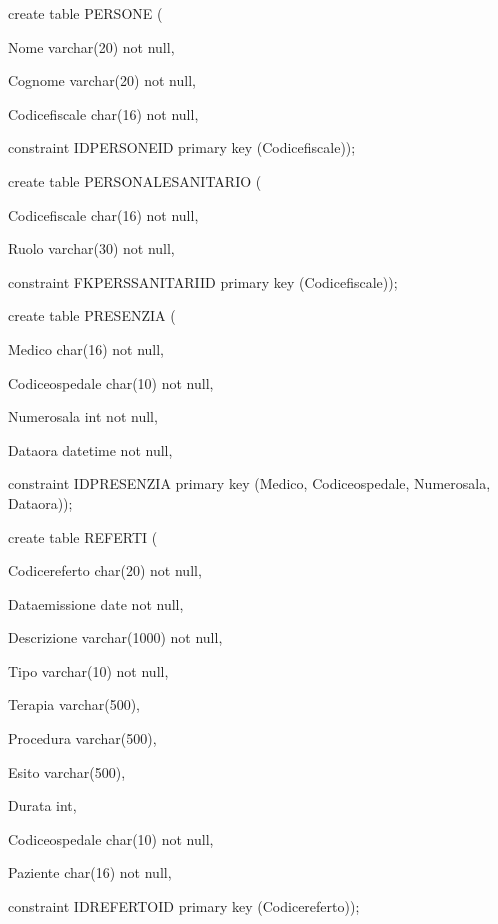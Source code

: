 \documentclass[a4paper,12pt]{report}
\begin{document}
\noindent create table PERSONE (

     Nome varchar(20) not null,
  
     Cognome varchar(20) not null,
  
     Codice\textunderscore fiscale char(16) not null,
  
     constraint IDPERSONE\textunderscore ID primary key (Codice\textunderscore fiscale)); \newline

\noindent create table PERSONALE\textunderscore SANITARIO (

     Codice\textunderscore fiscale char(16) not null,
  
     Ruolo varchar(30) not null,
  
     constraint FKPERS\textunderscore SANITARI\textunderscore ID primary key (Codice\textunderscore fiscale)); \newline

\noindent create table PRESENZIA (

     Medico char(16) not null,
  
     Codice\textunderscore ospedale char(10) not null,
  
     Numero\textunderscore sala int not null,
  
     Data\textunderscore ora datetime not null,
  
     constraint IDPRESENZIA primary key (Medico, Codice\textunderscore ospedale, Numero\textunderscore sala, Data\textunderscore ora)); \newline

\noindent create table REFERTI (

     Codice\textunderscore referto char(20) not null,
  
     Data\textunderscore emissione date not null,
  
     Descrizione varchar(1000) not null,
  
     Tipo varchar(10) not null,
  
     Terapia varchar(500),
  
     Procedura varchar(500),
  
     Esito varchar(500),
  
     Durata int,
  
     Codice\textunderscore ospedale char(10) not null,
  
     Paziente char(16) not null,
  
     constraint IDREFERTO\textunderscore ID primary key (Codice\textunderscore referto)); \newline
\end{document}
